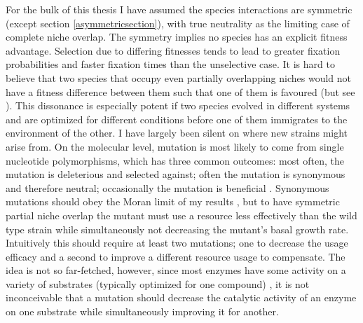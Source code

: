 For the bulk of this thesis I have assumed the species interactions are symmetric (except section \ref{asymmetricsection}), with true neutrality as the limiting case of complete niche overlap. 
The symmetry implies no species has an explicit fitness advantage. %
Selection due to differing fitnesses tends to lead to greater fixation probabilities and faster fixation times than the unselective case. 
It is hard to believe that two species that occupy even partially overlapping niches would not have a fitness difference between them such that one of them is favoured (but see \cite{Hubbell2006,Rosindell2011}). %
This dissonance is especially potent if two species evolved in different systems and are optimized for different conditions before one of them immigrates to the environment of the other. 
I have largely been silent on where new strains might arise from. 
On the molecular level, mutation is most likely to come from single nucleotide polymorphisms, which has three common outcomes: most often, the mutation is deleterious and selected against; often the mutation is synonymous and therefore neutral; occasionally the mutation is beneficial \cite{Kimura1983,Rouzine2001,Kawecki2004,Orr2005,Desai2007,Desai2007a,Patwa2008}. 
Synonymous mutations should obey the Moran limit of my results \cite{Kimura1955}, but to have symmetric partial niche overlap the mutant must use a resource less effectively than the wild type strain while simultaneously not decreasing the mutant's basal growth rate. 
Intuitively this should require at least two mutations; one to decrease the usage efficacy and a second to improve a different resource usage to compensate. 
The idea is not so far-fetched, however, since most enzymes have some activity on a variety of substrates (typically optimized for one compound) \cite{Gruning2010,Liscovitch1992}, it is not inconceivable that a mutation should decrease the catalytic activity of an enzyme on one substrate while simultaneously improving it for another. %

